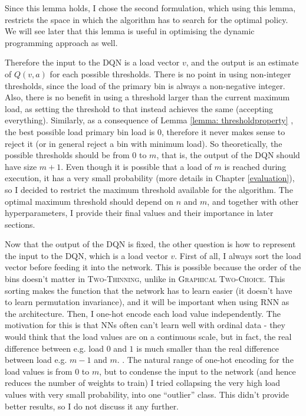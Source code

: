 
Since this lemma holds, I chose the second formulation, which using this lemma, restricts the space in which the algorithm has to search for the optimal policy. We will see later that this lemma is useful in optimising the dynamic programming approach as well.


Therefore the input to the DQN is a load vector $v$, and the output is an estimate of $Q(v, a)$ for each possible thresholds. There is no point in using non-integer thresholds, since the load of the primary bin is always a non-negative integer. Also, there is no benefit in using a threshold larger than the current maximum load, as setting the threshold to that instead achieves the same (accepting everything). Similarly, as a consequence of Lemma \ref{lemma: thresholdproperty} , the best possible load primary bin load is $0$, therefore it never makes sense to reject it (or in general reject a bin with minimum load). So theoretically, the possible thresholds should be from $0$ to $m$, that is, the output of the DQN should have size $m+1$. Even though it is possible that a load of $m$ is reached during execution, it has a very small probability (more details in Chapter \ref{evaluation}), so I decided to restrict the maximum threshold available for the algorithm. The optimal maximum threshold should depend on $n$ and $m$, and together with other hyperparameters, I provide their final values and their importance in later sections. 


Now that the output of the DQN is fixed, the other question is how to represent the input to the DQN, which is a load vector $v$. First of all, I always sort the load vector before feeding it into the network. This is possible because the order of the bins doesn't matter in \textsc{Two-Thinning}, unlike in \textsc{Graphical Two-Choice}. This sorting makes the function that the network has to learn easier (it doesn't have to learn permutation invariance), and it will be important when using RNN as the architecture. Then, I one-hot encode each load value independently. The motivation for this is that NNs often can't learn well with ordinal data - they would think that the load values are on a continuous scale, but in fact, the real difference between e.g. load $0$ and $1$ is much smaller than the real difference between load e.g. $m-1$ and $m$. . The natural range of one-hot encoding for the load values is from $0$ to $m$, but to condense the input to the network (and hence reduces the number of weights to train) I tried collapsing the very high load values with very small probability, into one ``outlier'' class. This didn't provide better results, so I do not discuss it any further.


